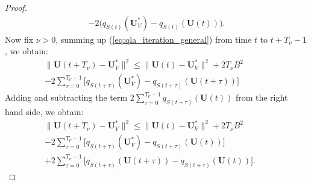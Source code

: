 \documentclass[journal]{IEEEtran}
\newcommand{\bv}[1]{{\boldsymbol{#1} }}
\begin{document}
\begin{proof}
\begin{eqnarray}
-2\big(q_{S(t)}(\bv{U}^*_V)-q_{S(t)}(\bv{U}(t))\big). \nonumber
\end{eqnarray}
Now fix $\nu>0$, summing up (\ref{eq:qla_iteration_general}) from time $t$ to $t+T_{\nu}-1$, we obtain:
\begin{eqnarray}
\|\bv{U}(t+T_{\nu})-\bv{U}^*_V\|^2\leq \|\bv{U}(t)-\bv{U}^*_V\|^2 + 2T_{\nu}B^2\label{eq:Tslotdrift_pre}\qquad\quad\\  %
-2\sum_{\tau=0}^{T_{\nu}-1}\big[q_{S(t+\tau)}(\bv{U}^*_V)-q_{S(t+\tau)}(\bv{U}(t+\tau))\big]\nonumber
\end{eqnarray}
Adding and subtracting the term $2\sum_{\tau=0}^{T_{\nu}-1}q_{S(t+\tau)}(\bv{U}(t))$ from the right hand side, we obtain:
\begin{eqnarray}
\|\bv{U}(t+T_{\nu})-\bv{U}^*_V\|^2\leq \|\bv{U}(t)-\bv{U}^*_V\|^2 + 2T_{\nu}B^2\label{eq:Tslotdrift_pre_manipulate}\qquad\quad\\
-2\sum_{\tau=0}^{T_{\nu}-1}\big[q_{S(t+\tau)}(\bv{U}^*_V)-q_{S(t+\tau)}(\bv{U}(t))\big]\qquad\nonumber\\
+2\sum_{\tau=0}^{T_{\nu}-1}\big[q_{S(t+\tau)}(\bv{U}(t+\tau))-q_{S(t+\tau)}(\bv{U}(t))\big].\nonumber
\end{eqnarray}



\end{proof}
\end{document}
